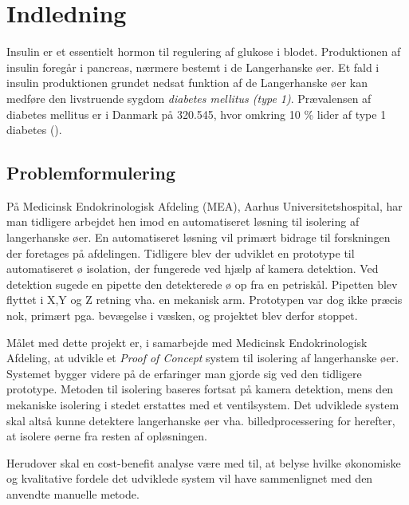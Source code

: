 \chapter{Indledning}
Insulin er et essentielt hormon til regulering af glukose i blodet. Produktionen af insulin foregår i pancreas, nærmere bestemt i de Langerhanske øer. Et fald i insulin produktionen grundet nedsat funktion af de Langerhanske øer kan medføre den livstruende sygdom \textit{diabetes mellitus (type 1)}. Prævalensen af diabetes mellitus er i Danmark på 320.545, hvor omkring 10 \% lider af type 1 diabetes (\cite{diabetes}).









\section{Problemformulering}
På Medicinsk Endokrinologisk Afdeling (MEA), Aarhus Universitetshospital, har man tidligere arbejdet hen imod en automatiseret løsning til isolering af langerhanske øer. En automatiseret løsning vil primært bidrage til forskningen der foretages på afdelingen. Tidligere blev der udviklet en prototype til automatiseret ø isolation, der fungerede ved hjælp af kamera detektion. Ved detektion sugede en pipette den detekterede ø op fra en petriskål. Pipetten blev flyttet i X,Y og Z retning vha. en mekanisk arm. Prototypen var dog ikke præcis nok, primært pga. bevægelse i væsken, og projektet blev derfor stoppet.

Målet med dette projekt er, i samarbejde med Medicinsk Endokrinologisk Afdeling, at udvikle et \textit{Proof of Concept} system til isolering af langerhanske øer. Systemet bygger videre på de erfaringer man gjorde sig ved den tidligere prototype. Metoden til isolering baseres fortsat på kamera detektion, mens den mekaniske isolering i stedet erstattes med et ventilsystem. Det udviklede system skal altså kunne detektere langerhanske øer vha. billedprocessering for herefter, at isolere øerne fra resten af opløsningen. 

Herudover skal en cost-benefit analyse være med til, at belyse hvilke økonomiske og kvalitative fordele det udviklede system vil have sammenlignet med den anvendte manuelle metode.

